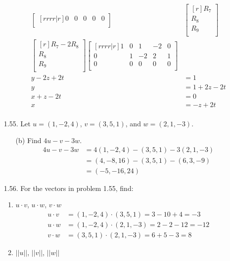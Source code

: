 \documentclass[12pt]{article}
\begin{document}
\begin{enumerate}
\begin{enumerate}
\begin{align*}
\begin{bmatrix}[rrrr|r]
	0 & 0 & 0 & 0 & 0\\
	\end{bmatrix}&
	\begin{bmatrix}[r]
	R_{7}\\ R_{8}\\ R_{9}\\	
	\end{bmatrix}\\
	\begin{bmatrix}[r]
	R_7 - 2R_8\\
	R_8\\
	R_9\\
	\end{bmatrix}
	\begin{bmatrix}[rrrr|r]
	1 & 0 & 1 & -2 & 0\\
	0 & 1 & -2 & 2 & 1\\
	0 & 0 & 0 & 0 & 0\\
	\end{bmatrix}\\
	y-2z+2t&=1\\
	y&=1+2z-2t\\
	x+z-2t&=0\\
	x&=-z+2t\\
	\end{align*}
	\end{enumerate}
\item[1.55.] Let $u=(1,-2,4)$, $v=(3,5,1)$, and $w=(2,1,-3)$. 
	\begin{enumerate}
	\item[(b)]
	Find $4u-v-3w$.
	\begin{align*}
		4u-v-3w
		&= 4(1,-2,4)-(3,5,1)-3(2,1,-3)\\
		&= (4,-8,16)-(3,5,1)-(6,3,-9)\\
		&= (-5,-16,24)
	\end{align*}
	\end{enumerate}
\item[1.56.] For the vectors in problem 1.55, find:
	\begin{enumerate}
	\item $u \cdot v$, $u \cdot w$, $v \cdot w$
	\begin{align*}
		u \cdot v &= (1,-2,4)\cdot(3,5,1) = 3-10+4 = -3\\
		u \cdot w &= (1,-2,4)\cdot(2,1,-3)= 2-2-12 = -12\\
		v \cdot w &= (3,5,1) \cdot(2,1,-3)= 6+5-3  = 8
	\end{align*}
	\item $||u||$, $||v||$, $||w||$

\end{enumerate}
\end{enumerate}
\end{document}
